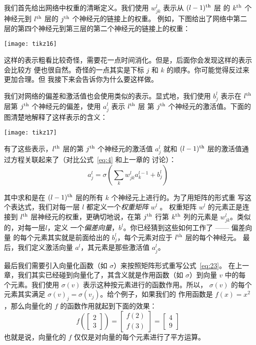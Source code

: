 我们首先给出网络中权重的清晰定义。我们使用 $w^l_{jk}$ 表示从 $(l-1)^{\rm th}$ 层
的 $k^{\rm th}$ 个神经元到 $l^{\rm th}$ 层的 $j^{\rm th}$ 个神经元的链接上的权重。
例如，下图给出了网络中第二层的第四个神经元到第三层的第二个神经元的链接上的权重：

\begin{center}
  \texttt{[image: tikz16]}
\end{center}

这样的表示粗看比较奇怪，需要花一点时间消化。但是，后面你会发现这样的表示会比较方
便也很自然。奇怪的一点其实是下标 $j$ 和 $k$ 的顺序。你可能觉得反过来更加合理。但
我接下来会告诉你为什么要这样做。

我们对网络的偏差和激活值也会使用类似的表示。显式地，我们使用 $b^l_j$ 表示在
$l^{\rm th}$ 层第 $j^{\rm th}$ 个神经元的偏差，使用 $a^l_j$ 表示 $l^{\rm th}$ 层
第 $j^{\rm th}$ 个神经元的激活值。下面的图清楚地解释了这样表示的含义：

\begin{center}
  \texttt{[image: tikz17]}
\end{center}

有了这些表示，$l^{\rm th}$ 层的第 $j^{\rm th}$ 个神经元的激活值 $a^{l}_j$ 就和
$(l-1)^{\rm th}$ 层的激活值通过方程关联起来了（对比公式~\eqref{eq:4} 和上一章的
  讨论）：
\begin{equation}
  a^{l}_j = \sigma\left( \sum_k w^{l}_{jk} a^{l-1}_k + b^l_j \right)
  \label{eq:23}\tag{23}
\end{equation}

其中求和是在 $(l-1)^{\rm th}$ 层的所有 $k$ 个神经元上进行的。为了用矩阵的形式重
写这个表达式，我们对每一层 $l$ 都定义一个\emph{权重矩阵} $w^l$ 。
权重矩阵 $w^l$ 的元素正是连接到 $l^{\rm th}$ 层神经元的权重，更确切地说，在第
$j^{\rm th}$ 行第 $k^{\rm th}$ 列的元素是 $w^l_{jk}$。类似的，对每一层$l$，定义
一个\emph{偏差向量}，$b^l$。你已经猜到这些如何工作了 —— 偏差向量
的每个元素其实就是前面给出的 $b^l_j$，每个元素对应于 $l^{\rm th}$ 层的每个神经元。
最后，我们定义激活向量 $a^l$，其元素是那些激活值 $a^l_j$。

最后我们需要引入向量化函数（如 $\sigma$）来按照矩阵形式重写公式~\eqref{eq:23}。
在上一章，我们其实已经碰到向量化了，其含义就是作用函数（如 $\sigma$）到向量 $v$
中的每个元素。我们使用 $\sigma(v)$ 表示这种按元素进行的函数作用。所以，
$\sigma(v)$ 的每个元素其实满足 $\sigma(v)_j = \sigma(v_j)$。给个例子，如果我们的
作用函数是 $f(x) = x^2$，那么向量化的 $f$ 的函数作用就起到下面的效果：
\begin{equation}
  f\left(\left[ \begin{array}{c} 2 \\ 3 \end{array} \right] \right)
  = \left[ \begin{array}{c} f(2) \\ f(3) \end{array} \right]
  = \left[ \begin{array}{c} 4 \\ 9 \end{array} \right]
\label{eq:24}\tag{24}
\end{equation}
也就是说，向量化的 $f$ 仅仅是对向量的每个元素进行了平方运算。


